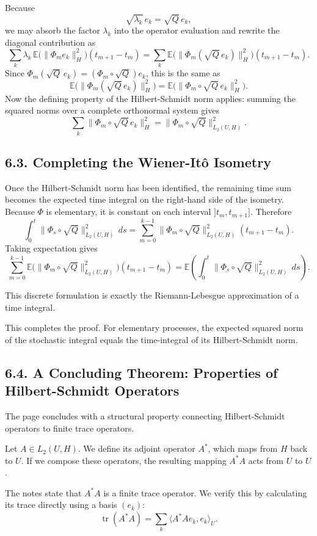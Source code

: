 \documentclass[11pt]{article}
\theoremstyle{definition}
\theoremstyle{remark}
\begin{document}
Because
\[
\sqrt{\lambda_k}\,e_k=\sqrt{Q}\,e_k,
\]
we may absorb the factor \(\lambda_k\) into the operator evaluation and rewrite the diagonal contribution as
\[
\sum_k \lambda_k\,\mathbb E\bigl(\|\Phi_m e_k\|_H^2\bigr)(t_{m+1}-t_m)
=
\sum_k \mathbb E\bigl(\|\Phi_m(\sqrt{Q}\,e_k)\|_H^2\bigr)(t_{m+1}-t_m).
\]
Since \(\Phi_m(\sqrt{Q}\,e_k)=(\Phi_m\circ \sqrt{Q})e_k\), this is the same as
\[
\mathbb E\bigl(\|\Phi_m(\sqrt{Q}\,e_k)\|_H^2\bigr)
=
\mathbb E\bigl(\|\Phi_m\circ \sqrt{Q}\, e_k\|_H^2\bigr).
\]
Now the defining property of the Hilbert-Schmidt norm applies: summing the squared norms over a complete orthonormal system gives
\[
\sum_k \|\Phi_m\circ \sqrt{Q}\,e_k\|_H^2
=
\|\Phi_m\circ \sqrt{Q}\|_{L_2(U,H)}^2.
\]

\subsection*{6.3. Completing the Wiener-It\^o Isometry}
Once the Hilbert-Schmidt norm has been identified, the remaining time sum becomes the expected time integral on the right-hand side of the isometry.
Because \(\Phi\) is elementary, it is constant on each interval \(]t_m,t_{m+1}]\). Therefore
\[
\int_0^t \|\Phi_s\circ \sqrt{Q}\|_{L_2(U,H)}^2\,ds
=
\sum_{m=0}^{k-1}\|\Phi_m\circ \sqrt{Q}\|_{L_2(U,H)}^2(t_{m+1}-t_m).
\]
Taking expectation gives
\[
\sum_{m=0}^{k-1}\mathbb E\bigl(\|\Phi_m\circ \sqrt{Q}\|_{L_2(U,H)}^2\bigr)(t_{m+1}-t_m)
=
\mathbb E\left(\int_0^t \|\Phi_s\circ \sqrt{Q}\|_{L_2(U,H)}^2\,ds\right).
\]

This discrete formulation is exactly the Riemann-Lebesgue approximation of a time integral.

This completes the proof. For elementary processes, the expected squared norm of the stochastic integral equals the time-integral of its Hilbert-Schmidt norm.

\subsection*{6.4. A Concluding Theorem: Properties of Hilbert-Schmidt Operators}
The page concludes with a structural property connecting Hilbert-Schmidt operators to finite trace operators.

Let \(A\in L_2(U,H)\). We define its adjoint operator \(A^*\), which maps from \(H\) back to \(U\). If we compose these operators, the resulting mapping \(A^*A\) acts from \(U\) to \(U\).

The notes state that \(A^*A\) is a finite trace operator. We verify this by calculating its trace directly using a basis \((e_k)\):
\[
\operatorname{tr}(A^*A)=\sum_k \langle A^*Ae_k,e_k\rangle_U.
\]
\end{document}
